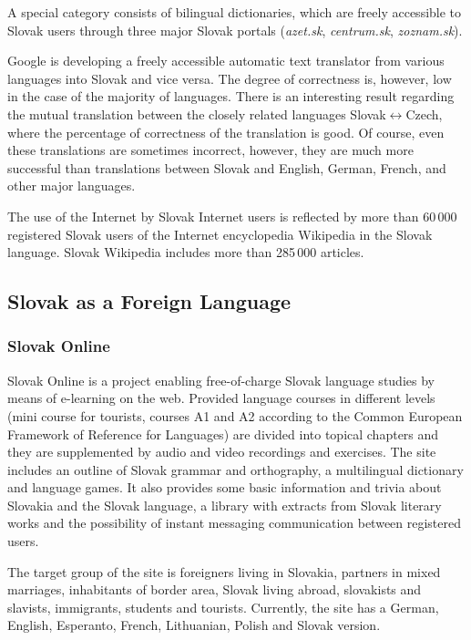 \begin{multicols}{2}
A special category consists of bilingual dictionaries, which are freely
accessible to Slovak users through three major Slovak portals
(\emph{azet.sk}, \emph{centrum.sk}, \emph{zoznam.sk}). 

Google is developing a freely accessible automatic text translator from
various languages into Slovak and vice versa. The degree of correctness
is, however, low in the case of the majority of languages. There is an
interesting result regarding the mutual translation between the closely
related languages Slovak$\leftrightarrow$Czech, where the percentage of
correctness of the translation is good. Of course, even these
translations are sometimes incorrect, however, they are much more
successful than translations between Slovak and English, German, French,
and other major languages.  

The use of the Internet by Slovak Internet users is reflected by more
than 60\,000 registered Slovak users of the Internet encyclopedia
Wikipedia in the Slovak language. Slovak Wikipedia includes more than
285\,000 articles. 

\subsection{Slovak as a Foreign Language}
\subsubsection{Slovak Online}
Slovak Online\cite{f6} is a project enabling free-of-charge Slovak language studies by means of e-learning on the web. Provided language courses in different levels (mini course for tourists, courses A1 and A2 according to the Common European Framework of Reference for Languages) are divided into topical chapters and they are supplemented by audio and video recordings and exercises. The site includes an outline of Slovak grammar and orthography, a multilingual dictionary and language games. It also provides some basic information and trivia about Slovakia and the Slovak language, a library with  extracts from Slovak literary works and the possibility of instant messaging communication between registered users.


The target group of the site is foreigners living in Slovakia, partners in mixed marriages, inhabitants of border area, Slovak living abroad, slovakists and slavists, immigrants, students and tourists. Currently, the site has a German, English, Esperanto, French, Lithuanian, Polish and Slovak version.


\end{multicols}

